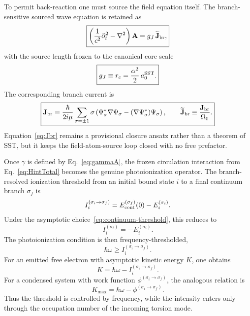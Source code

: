 \documentclass[11pt,a4paper]{article}
\begin{document}
To permit back-reaction one must source the field equation itself. The branch-sensitive sourced wave equation is retained as
\begin{equation}
\label{eq:Awave-source}
\boxed{
\left(\frac{1}{c^2}\partial_t^2-\nabla^2\right)\mathbf A
=
g_J \,\widetilde{\mathbf J}_{\rm br},
}
\end{equation}
with the source length frozen to the canonical core scale
\begin{equation}
\label{eq:gJfreeze}
\boxed{
 g_J \equiv r_c = \frac{\alpha^2}{2}\,a_0^{\rm SST}.
}
\end{equation}
The corresponding branch current is
\begin{equation}
\label{eq:Jbr}
\boxed{
\mathbf J_{\rm br}
=
\frac{\hbar}{2 i \mu}
\sum_{\sigma=\pm 1}
\sigma
\left(
\Psi_\sigma^*\nabla\Psi_\sigma
-
(\nabla\Psi_\sigma^*)\Psi_\sigma
\right),
\qquad
\widetilde{\mathbf J}_{\rm br}\equiv \frac{\mathbf J_{\rm br}}{\Omega_0}.
}
\end{equation}
Equation~\eqref{eq:Jbr} remains a provisional closure ansatz rather than a theorem of SST, but it keeps the field-atom-source loop closed with no free prefactor.

Once $\gamma$ is defined by Eq.~\eqref{eq:gammaA}, the frozen circulation interaction from Eq.~\eqref{eq:HintTotal} becomes the genuine photoionization operator. The branch-resolved ionization threshold from an initial bound state $i$ to a final continuum branch $\sigma_f$ is
\begin{equation}
\label{eq:IonizationThresholdGeneral}
I_i^{(\sigma_i\to \sigma_f)}
=
E_{\rm cont}^{(\sigma_f)}(0)-E_i^{(\sigma_i)}.
\end{equation}
Under the asymptotic choice~\eqref{eq:continuum-threshold}, this reduces to
\begin{equation}
\label{eq:IonizationThresholdSimple}
I_i^{(\sigma_i)}=-E_i^{(\sigma_i)}.
\end{equation}
The photoionization condition is then frequency-thresholded,
\begin{equation}
\label{eq:PhotoThreshold}
\boxed{
\hbar\omega \ge I_i^{(\sigma_i\to \sigma_f)}.
}
\end{equation}
For an emitted free electron with asymptotic kinetic energy $K$, one obtains
\begin{equation}
\label{eq:KineticEnergyAtom}
\boxed{
K
=
\hbar\omega - I_i^{(\sigma_i\to \sigma_f)}.
}
\end{equation}
For a condensed system with work function $\phi^{(\sigma_i\to \sigma_f)}$, the analogous relation is
\begin{equation}
\label{eq:PhotoelectricSolid}
\boxed{
K_{\max}
=
\hbar\omega - \phi^{(\sigma_i\to \sigma_f)}.
}
\end{equation}
Thus the threshold is controlled by frequency, while the intensity enters only through the occupation number of the incoming torsion mode.
\end{document}
